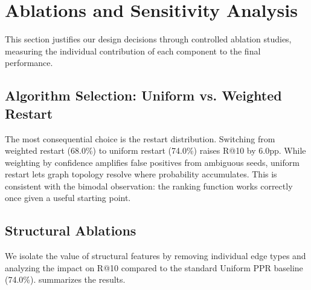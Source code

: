 \section{Ablations and Sensitivity Analysis}
\label{sec:eval-ablations}

This section justifies our design decisions through controlled ablation studies, measuring the individual contribution of each component to the final performance.

\subsection{Algorithm Selection: Uniform vs. Weighted Restart}
\label{sec:eval-ablation-algorithm}

The most consequential choice is the restart distribution. Switching from weighted restart (68.0\%) to uniform restart (74.0\%) raises R@10 by 6.0pp. While weighting by confidence amplifies false positives from ambiguous seeds, uniform restart lets graph topology resolve where probability accumulates. This is consistent with the bimodal observation: the ranking function works correctly once given a useful starting point.

\subsection{Structural Ablations}
\label{sec:eval-ablation-structure}

We isolate the value of structural features by removing individual edge types and analyzing the impact on R@10 compared to the standard Uniform PPR baseline (74.0\%).  summarizes the results.

